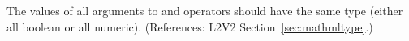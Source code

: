 The values of all arguments to  and 
operators should have the same type (either all boolean or all
numeric).   (References: L2V2 Section~\ref{sec:mathmltype}.)
